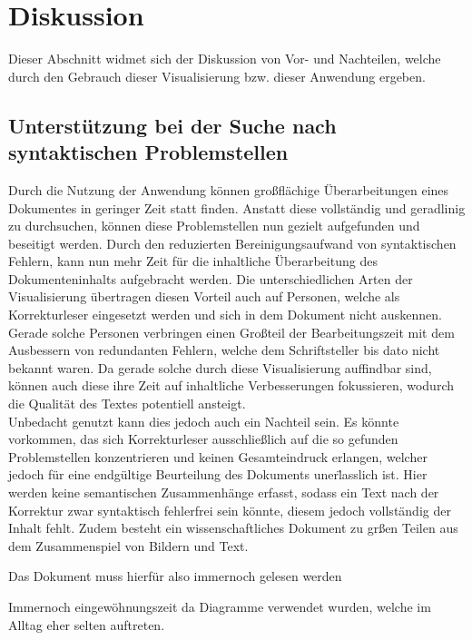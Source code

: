 \section{Diskussion}
Dieser Abschnitt widmet sich der Diskussion von Vor- und Nachteilen, welche durch den Gebrauch dieser Visualisierung bzw. dieser Anwendung ergeben.

\subsection{Unterst\"utzung bei der Suche nach syntaktischen Problemstellen}
Durch die Nutzung der Anwendung k\"onnen gro{\ss}fl\"achige \"Uberarbeitungen eines Dokumentes in geringer Zeit statt finden. Anstatt diese vollst\"andig und geradlinig zu durchsuchen, k\"onnen diese Problemstellen nun gezielt aufgefunden und beseitigt werden. Durch den reduzierten Bereinigungsaufwand von syntaktischen Fehlern, kann nun mehr Zeit f\"ur die inhaltliche \"Uberarbeitung des Dokumenteninhalts aufgebracht werden. Die unterschiedlichen Arten der Visualisierung \"ubertragen diesen Vorteil auch auf Personen, welche als Korrekturleser eingesetzt werden und sich in dem Dokument nicht auskennen. Gerade solche Personen verbringen einen Gro{\ss}teil der Bearbeitungszeit mit dem Ausbessern von redundanten Fehlern, welche dem Schriftsteller bis dato nicht bekannt waren. Da gerade solche durch diese Visualisierung auffindbar sind, k\"onnen auch diese ihre Zeit auf inhaltliche Verbesserungen fokussieren, wodurch die Qualit\"at des Textes potentiell ansteigt.\\
Unbedacht genutzt kann dies jedoch auch ein Nachteil sein. Es k\"onnte vorkommen, das sich Korrekturleser ausschlie{\ss}lich auf die so gefunden Problemstellen konzentrieren und keinen Gesamteindruck erlangen, welcher jedoch f\"ur eine endg\"ultige Beurteilung des Dokuments uner\"lasslich ist. Hier werden keine semantischen Zusammenh\"ange erfasst, sodass ein Text nach der Korrektur zwar syntaktisch fehlerfrei sein k\"onnte, diesem jedoch vollst\"andig der Inhalt fehlt. Zudem besteht ein wissenschaftliches Dokument zu gr{\ss}en Teilen aus dem Zusammenspiel von Bildern und Text. 

Das Dokument muss hierf\"ur also immernoch gelesen werden

Immernoch eingew\"ohnungszeit da Diagramme verwendet wurden, welche im Alltag eher selten auftreten.